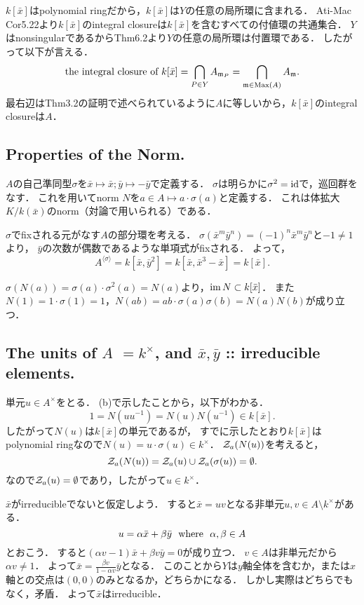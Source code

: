 \documentclass[a4paper]{jsarticle}
\begin{document}
    $k[\bar{x}]$はpolynomial ringだから，$k[\bar{x}]$は$Y$の任意の局所環に含まれる．
    Ati-Mac Cor5.22より$k[\bar{x}]$のintegral closureは$k[\bar{x}]$を含むすべての付値環の共通集合．
    $Y$はnonsingularであるからThm6.2より$Y$の任意の局所環は付置環である．
    したがって以下が言える．
    \[ \text{the integral closure of }k[\bar{x}] = \bigcap_{P \in Y} A_{\mathfrak{m}_P}=\bigcap_{\mathfrak{m} \in \operatorname{Max}(A)} A_{\mathfrak{m}}. \]
    最右辺はThm3.2の証明で述べられているように$A$に等しいから，$k[\bar{x}]$のintegral closureは$A$．

    \subsection{Properties of the Norm.}
    $A$の自己準同型$\sigma$を$\bar{x} \mapsto \bar{x}; \bar{y} \mapsto -\bar{y}$で定義する．
    $\sigma$は明らかに$\sigma^2=\mathrm{id}_{\!}$で，巡回群をなす．
    これを用いてnorm $N$を$a \in A \mapsto a \cdot \sigma(a)$と定義する．
    これは体拡大$K/k(\bar{x})$のnorm（対論で用いられる）である．

    $\sigma$でfixされる元がなす$A$の部分環を考える．
    $\sigma(\bar{x}^m \bar{y}^n)=(-1)^n \bar{x}^m \bar{y}^n$と$-1 \neq 1$より，
    $\bar{y}$の次数が偶数であるような単項式がfixされる．
    よって，
    \[ A^{\langle \sigma \rangle}=k[\bar{x}, \bar{y}^2]=k[\bar{x}, \bar{x}^3-\bar{x}]=k[\bar{x}]. \]

    $\sigma(N(a))=\sigma(a) \cdot \sigma^2(a)=N(a)$より，$\operatorname{im} N \subset k[\bar{x}]$．
    また$N(1)=1 \cdot \sigma(1)=1$，$N(ab)=ab \cdot \sigma(a) \sigma(b)=N(a)N(b)$が成り立つ．

    \subsection{The units of $A$ $=k^{\times}$, and $\bar{x}, \bar{y}$ :: irreducible elements.}
    単元$u \in A^{\times}$をとる．
    (b)で示したことから，以下がわかる．
    \[ 1=N(u u^{-1})=N(u) N(u^{-1}) \in k[\bar{x}]. \]
    したがって$N(u)$は$k[\bar{x}]$の単元であるが，
    すでに示したとおり$k[\bar{x}]$はpolynomial ringなので$N(u)=u \cdot \sigma(u) \in k^{\times}$．
    $\mathcal{Z}_a(N(u))$を考えると，
    \[ \mathcal{Z}_a(N(u))=\mathcal{Z}_a(u) \cup \mathcal{Z}_a(\sigma(u))=\emptyset. \]
    なので$\mathcal{Z}_a(u)=\emptyset$であり，したがって$u \in k^{\times}$．

    $\bar{x}$がirreducibleでないと仮定しよう．
    すると$\bar{x}=u v$となる非単元$u,v \in A \setminus k^{\times}$がある．
    \[ u=\alpha \bar{x}+\beta \bar{y} ~~\text{where}~~ \alpha,\beta \in A \]
    とおこう．
    すると$(\alpha v-1) \bar{x}+\beta v \bar{y}=0$が成り立つ．
    $v \in A$は非単元だから$\alpha v \neq 1$．
    よって$\bar{x}=\frac{\beta v}{1- \alpha v} \bar{y}$となる．
    このことから$Y$は$y$軸全体を含むか，または$x$軸との交点は$(0,0)$のみとなるか，どちらかになる．
    しかし実際はどちらでもなく，矛盾．
    よって$\bar{x}$はirreducible．
\end{document}
